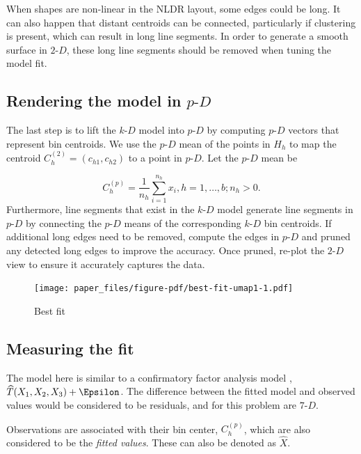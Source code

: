 \documentclass[
  12pt]{article}
\newcommand\pD{$p\text{-}D$}
\newcommand\kD{$k\text{-}D$}
\newcommand\gD{$2\text{-}D$}
\begin{document}
When shapes are non-linear in the NLDR layout, some edges could be long.
It can also happen that distant centroids can be connected, particularly
if clustering is present, which can result in long line segments. In
order to generate a smooth surface in \gD{}, these long line segments
should be removed when tuning the model fit.

\subsection{\texorpdfstring{Rendering the model in
\pD{}}{Rendering the model in }}\label{rendering-the-model-in}

The last step is to lift the \kD{} model into \pD{} by computing \pD{}
vectors that represent bin centroids. We use the \pD{} mean of the
points in \(H_h\) to map the centroid \(C_{h}^{(2)} = (c_{h1}, c_{h2})\)
to a point in \pD{}. Let the \pD{} mean be

\[C_{h}^{(p)} = \frac{1}{n_h}\sum_{i =1}^{n_h} x_i, h = {1, \dots, b; n_h > 0}.\]
Furthermore, line segments that exist in the \kD{} model generate line
segments in \pD{} by connecting the \pD{} means of the corresponding
\kD{} bin centroids. If additional long edges need to be removed,
compute the edges in \pD{} and pruned any detected long edges to improve
the accuracy. Once pruned, re-plot the \gD{} view to ensure it
accurately captures the data.

\begin{figure}[H]

{\centering \texttt{[image: paper\_files/figure-pdf/best-fit-umap1-1.pdf]}

}

\caption{Best fit}

\end{figure}%

\subsection{Measuring the fit}\label{sec-summary}

The model here is similar to a confirmatory factor analysis model
\citep{brown2015}, \(\widehat{T}(X_1, X_2, X_3) + \Epsilon\). The
difference between the fitted model and observed values would be
considered to be residuals, and for this problem are \(7\text{-}D\).

Observations are associated with their bin center, \(C_{h}^{(p)}\),
which are also considered to be the \emph{fitted values}. These can also
be denoted as \(\widehat{X}\).
\end{document}
